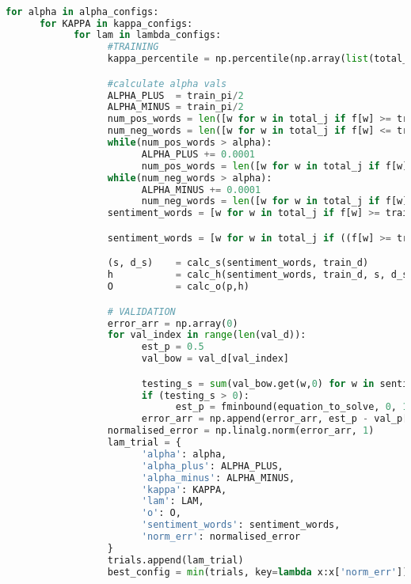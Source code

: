 \documentclass[ oneside,%
                    author={Joshua Felmeden},
                    degree={MEng},
                     title={Sentiment Analysis of Financial Headlines Based on Realised Stock Returns},
                  subtitle={Research}]{dissertation}
\begin{document}
\begin{lstlisting}[float={!htb},caption={Original training and validation window},label={lst:train-val-orig},language=Python]

for alpha in alpha_configs:
      for KAPPA in kappa_configs:
            for lam in lambda_configs:
                  #TRAINING
                  kappa_percentile = np.percentile(np.array(list(total_j.values())),KAPPA) # return the nth percentile of all appearances for KAPPA

                  #calculate alpha vals
                  ALPHA_PLUS  = train_pi/2
                  ALPHA_MINUS = train_pi/2
                  num_pos_words = len([w for w in total_j if f[w] >= train_pi + ALPHA_PLUS and total_j[w] >= kappa_percentile])
                  num_neg_words = len([w for w in total_j if f[w] <= train_pi - ALPHA_MINUS and total_j[w] >= kappa_percentile])
                  while(num_pos_words > alpha):
                        ALPHA_PLUS += 0.0001
                        num_pos_words = len([w for w in total_j if f[w] >= train_pi + ALPHA_PLUS and total_j[w] >= kappa_percentile])
                  while(num_neg_words > alpha):
                        ALPHA_MINUS += 0.0001
                        num_neg_words = len([w for w in total_j if f[w] <= train_pi - ALPHA_MINUS and total_j[w] >= kappa_percentile])
                  sentiment_words = [w for w in total_j if f[w] >= train_pi + ALPHA_PLUS and total_j[w] >= kappa_percentile])

                  sentiment_words = [w for w in total_j if ((f[w] >= train_pi + ALPHA_PLUS or f[w] <= train_pi - ALPHA_MINUS) and total_j[w] >= kappa_percentile)]

                  (s, d_s)    = calc_s(sentiment_words, train_d)
                  h           = calc_h(sentiment_words, train_d, s, d_s)
                  O           = calc_o(p,h)

                  # VALIDATION
                  error_arr = np.array(0)
                  for val_index in range(len(val_d)):
                        est_p = 0.5
                        val_bow = val_d[val_index]

                        testing_s = sum(val_bow.get(w,0) for w in sentiment_words)
                        if (testing_s > 0):
                              est_p = fminbound(equation_to_solve, 0, 1, (O,val_bow, sentiment_words,testing_s,LAM))
                        error_arr = np.append(error_arr, est_p - val_p[val_index])
                  normalised_error = np.linalg.norm(error_arr, 1)
                  lam_trial = {
                        'alpha': alpha,
                        'alpha_plus': ALPHA_PLUS,
                        'alpha_minus': ALPHA_MINUS,
                        'kappa': KAPPA,
                        'lam': LAM,
                        'o': O,
                        'sentiment_words': sentiment_words,
                        'norm_err': normalised_error
                  }
                  trials.append(lam_trial)
                  best_config = min(trials, key=lambda x:x['norm_err'])
\end{lstlisting}
\end{document}
